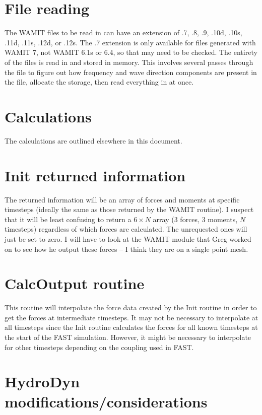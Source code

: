 \section{File reading}
The WAMIT files to be read in can have an extension of .7, .8, .9, .10d, .10s, .11d, .11s, .12d, or .12s. The .7 extension is only available for files generated with WAMIT 7, not WAMIT 6.1s or 6.4, so that may need to be checked.
The entirety of the files is read in and stored in memory.  This involves several passes through the file to figure out how frequency and wave direction components are present in the file, allocate the storage, then read everything in at once.

\section{Calculations}
The calculations are outlined elsewhere in this document.

\section{Init returned information}
The returned information will be an array of forces and moments at specific timesteps (ideally the same as those returned by the WAMIT routine). I suspect that it will be least confusing to return a $6\times N$ array (3 forces, 3 moments, $N$ timesteps) regardless of which forces are calculated. The unrequested ones will just be set to zero. I will have to look at the WAMIT module that Greg worked on to see how he output these forces -- I think they are on a single point mesh.

\section{CalcOutput routine}
This routine will interpolate the force data created by the Init routine in order to get the forces at intermediate timesteps. It may not be necessary to interpolate at all timesteps since the Init routine calculates the forces for all known timesteps at the start of the FAST simulation. However, it might be necessary to interpolate for other timesteps depending on the coupling used in FAST.

\section{HydroDyn modifications/considerations}


